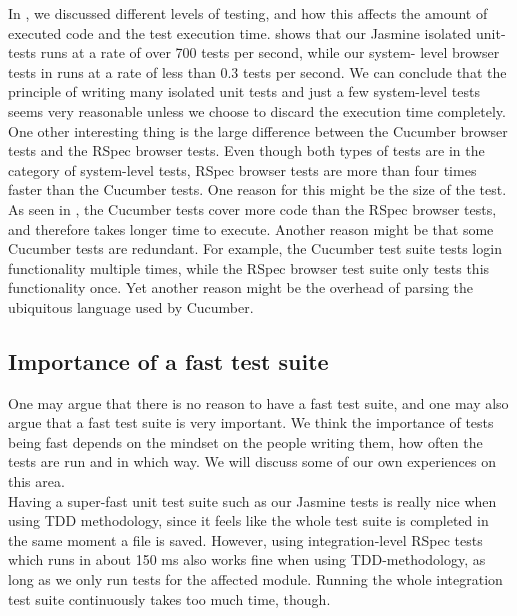 In , we discussed different levels of testing,
and how this affects the amount of executed code and the test execution
time.  shows that our Jasmine isolated unit-
tests runs at a rate of over 700 tests per second, while our system-
level browser tests in  runs at a rate of
less than 0.3 tests per second. We can conclude that the principle of
writing many isolated unit tests and just a few system-level tests seems
very reasonable unless we choose to discard the execution time
completely.\\

One other interesting thing is the large difference between the Cucumber
browser tests and the RSpec browser tests. Even though both types of
tests are in the category of system-level tests, RSpec browser tests are
more than four times faster than the Cucumber tests. One reason for this
might be the size of the test. As seen in ,
the Cucumber tests cover more code than the RSpec browser tests, and
therefore takes longer time to execute. Another reason might be that
some Cucumber tests are redundant. For example, the Cucumber test suite
tests login functionality multiple times, while the RSpec browser test
suite only tests this functionality once. Yet another reason might be
the overhead of parsing the ubiquitous language used by Cucumber.\\


\subsection{Importance of a fast test suite}

One may argue that there is no reason to have a fast test suite, and one
may also argue that a fast test suite is very important. We think the
importance of tests being fast depends on the mindset on the people
writing them, how often the tests are run and in which way. We will
discuss some of our own experiences on this area.\\

Having a super-fast unit test suite such as our Jasmine tests is really
nice when using TDD methodology, since it feels like the whole test
suite is completed in the same moment a file is saved. However, using
integration-level RSpec tests which runs in about 150 ms also works fine
when using TDD-methodology, as long as we only run tests for the
affected module. Running the whole integration test suite continuously
takes too much time, though.\\

